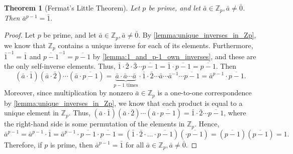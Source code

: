 \documentclass[10pt, titlepage]{amsart}
\newcommand\Z{{\mathbb Z}}
\newtheorem{theorem}{Theorem}[subsection]
\theoremstyle{definition}
\begin{document}
	
	\begin{theorem}[Fermat's Little Theorem]\label{theorem:fermats_little_theorem}
		Let $p$ be prime, and let $\bar{a} \in \Z_p, \bar{a} \neq \bar{0}$. Then $ \bar{a}^{p-1} = \bar{1}.$ \cite{pommersheim}
	\end{theorem}
	
	\begin{proof}
		Let $p$ be prime, and let $\bar{a} \in \Z_p, \bar{a} \neq \bar{0}$.
		By \cref{lemma:unique_inverses_in_Zp}, we know that $\Z_p$ contains a unique inverse for each of its elements. 
		Furthermore, $\bar{1}^{-1} = \bar{1}$ and $\overline{p-1}^{-1} = \overline{p-1}$ by \cref{lemma:1_and_p-1_own_inverses}, and these are the only self-inverse elements.
		Thus, $\bar{1} \cdot \bar{2} \cdot \bar{3} \cdots \overline{p-1} = \bar{1} \cdot \overline{p-1} = \overline{p-1}$. 
		Then 
		$$
		(\bar{a} \cdot \bar{1})(\bar{a} \cdot \bar{2}) \cdots (\bar{a} \cdot \overline{p-1})
		= \underbrace{\bar{a} \cdot \bar{a} \cdots \bar{a}}_{p-1 \text{ times}} \cdot \bar{1} \cdot \bar{2} \cdots \bar{a} \cdots \bar{a}^{-1} \cdots \overline{p-1}
		= \bar{a}^{p-1} \cdot \overline{p-1}.
		$$
		Moreover, since multiplication by nonzero $\bar{a} \in \Z_p$ is a one-to-one correspondence by \cref{lemma:unique_inverses_in_Zp}, we know that each product is equal to a unique element in $\Z_p$.
		Thus, $(\bar{a} \cdot \bar{1})(\bar{a} \cdot \bar{2}) \cdots (\bar{a} \cdot \overline{p-1}) = \bar{1} \cdot \bar{2} \cdots \overline{p-1}$, where the right-hand side is some permutation of the elements in $\Z_p$.
		Hence,
		$$ \bar{a}^{p-1} = \bar{a}^{p-1} \cdot \bar{1} = \bar{a}^{p-1} \cdot \overline{p - 1} \cdot \overline{p - 1} = (\bar{1} \cdot \bar{2} \cdot \ldots \cdot \overline{p - 1})(\cdot \overline{p - 1}) = (\overline{p - 1})(\overline{p - 1}) = 1.$$
		Therefore, if $p$ is prime, then $\bar{a}^{p-1} = \bar{1}$ for all $\bar{a} \in \Z_p, \bar{a} \neq \bar{0}$.
	\end{proof}
	
\end{document}
